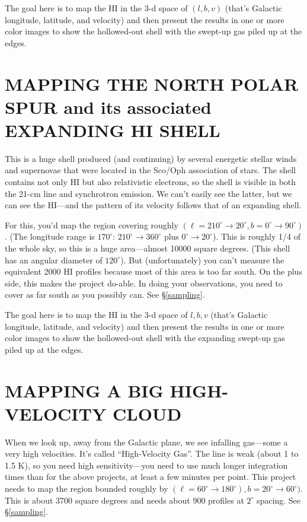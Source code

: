 \documentclass[psfig,preprint]{aastex}
\begin{document}
The goal here is to map the HI in the 3-d space of $(l, b, v)$ (that's
Galactic longitude, latitude, and velocity) and then present the results
in one or more color images to show the hollowed-out shell with the
swept-up gas piled up at the edges.

\section{MAPPING THE NORTH POLAR SPUR and its associated EXPANDING HI SHELL}

This is a huge shell produced (and continuing) by several energetic
stellar winds and supernovae that were located in the Sco/Oph
association of stars. The shell contains not only HI but also
relativistic electrons, so the shell is visible in both the 21-cm line
and synchrotron emission. We can't easily see the latter, but we can see
the HI---and the pattern of its velocity follows that of an expanding
shell.

For this, you'd map the region covering roughly $(\ell=210^\circ
\rightarrow 20^\circ, b=0^\circ \rightarrow 90^\circ)$. (The longitude
range is $170^\circ$: $210^\circ \rightarrow 360^\circ$ plus $0^\circ
\rightarrow 20^\circ$). This is roughly 1/4 of the whole sky, so this is
a huge area---almost 10000 square degrees. (This shell has an angular
diameter of $120^\circ$). But (unfortunately) you can't measure the
equivalent 2000 HI profiles because most of this area is too far
south. On the plus side, this makes the project do-able. In doing your
observations, you need to cover as far south as you possibly can. See
\S \ref{sampling}.

The goal here is to map the HI in the 3-d space of ${l, b, v}$ (that's
Galactic longitude, latitude, and velocity) and then present the results
in one or more color images to show the hollowed-out shell with the
expanding swept-up gas piled up at the edges.

\section{MAPPING A BIG HIGH-VELOCITY CLOUD}

When we look up, away from the Galactic plane, we see infalling
gas---some a very high velocities. It's called ``High-Velocity Gas''.
The line is weak (about 1 to 1.5 K), so you need high sensitivity---you
need to use much longer integration times than for the above projects,
at least a few minutes per point.  This project needs to map the region
bounded roughly by $(\ell=60^\circ \rightarrow 180^\circ), b=20^\circ
\rightarrow 60^\circ)$. This is about 3700 square degrees and needs
about 900 profiles at $2^\circ$ spacing. See
\S \ref{sampling}.
\end{document}
